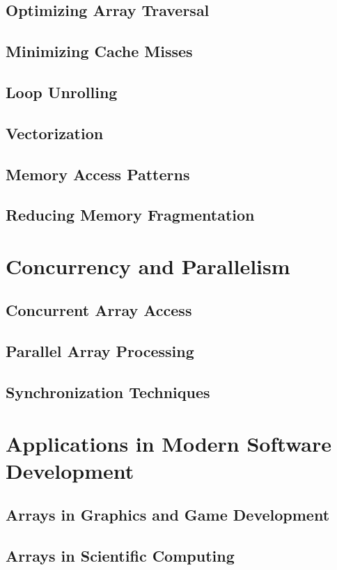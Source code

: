 \documentclass[12pt, oneside]{book}
\begin{document}
\section{Optimizing Array Traversal}
\section{Minimizing Cache Misses}
\section{Loop Unrolling}
\section{Vectorization}
\section{Memory Access Patterns}
\section{Reducing Memory Fragmentation}

\chapter{Concurrency and Parallelism}
\section{Concurrent Array Access}
\section{Parallel Array Processing}
\section{Synchronization Techniques}

\chapter{Applications in Modern Software Development}
\section{Arrays in Graphics and Game Development}
\section{Arrays in Scientific Computing}
\end{document}
